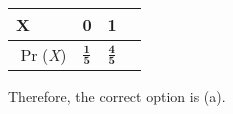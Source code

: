 \documentclass[journal,12pt,twocolumn]{IEEEtran}
\begin{document}
\begin{center}
\begin{tabular}{ | m{1.5cm} | m{1.75cm}| m{1.75cm} | m{1.75cm}| } 
\hline \vspace{2pt}

X     & \hspace{0.5cm}0                & \hspace{0.5cm}1            \\ \hline \vspace{8pt}
\(\Pr\)(\emph{X}) & \hspace{0.5cm}\(\frac{\textbf{1}}{\textbf{5}}\) & \hspace{0.5cm}\(\frac{\textbf{4}}{\textbf{5}}\) \\ 
\hline
\end{tabular}
\label{tab:B-1}
\end{center}

Therefore, the correct option is (a).
\end{document}
